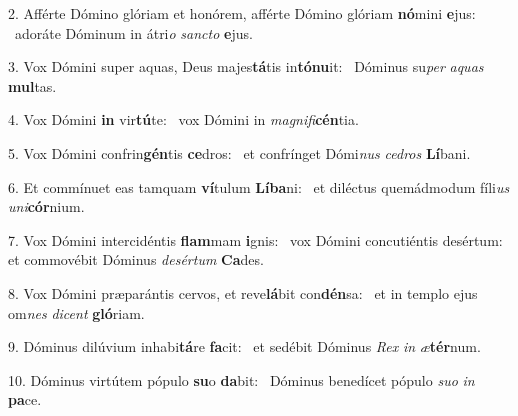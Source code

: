 2. Afférte Dómino glóriam et honórem, afférte Dómino glóriam \textbf{nó}mini \textbf{e}jus: \ast\  adoráte Dóminum in átri\textit{o} \textit{sanc}\textit{to} \textbf{e}jus.\

3. Vox Dómini super aquas, Deus majes\textbf{tá}tis in\textbf{tó}\textbf{nu}it: \ast\  Dóminus su\textit{per} \textit{a}\textit{quas} \textbf{mul}tas.\

4. Vox Dómini \textbf{in} vir\textbf{tú}te: \ast\  vox Dómini in \textit{ma}\textit{gni}\textit{fi}\textbf{cén}tia.\

5. Vox Dómini confrin\textbf{gén}tis \textbf{ce}dros: \ast\  et confrínget Dómi\textit{nus} \textit{ce}\textit{dros} \textbf{Lí}bani.\

6. Et commínuet eas tamquam \textbf{ví}tulum \textbf{Lí}\textbf{ba}ni: \ast\  et diléctus quemádmodum fíli\textit{us} \textit{u}\textit{ni}\textbf{cór}nium.\

7. Vox Dómini intercidéntis \textbf{flam}mam \textbf{i}gnis: \ast\  vox Dómini concutiéntis desértum: et commovébit Dóminus \textit{de}\textit{sér}\textit{tum} \textbf{Ca}des.\

8. Vox Dómini præparántis cervos, et reve\textbf{lá}bit con\textbf{dén}sa: \ast\  et in templo ejus om\textit{nes} \textit{di}\textit{cent} \textbf{gló}riam.\

9. Dóminus dilúvium inhabi\textbf{tá}re \textbf{fa}cit: \ast\  et sedébit Dóminus \textit{Rex} \textit{in} \textit{æ}\textbf{tér}num.\

10. Dóminus virtútem pópulo \textbf{su}o \textbf{da}bit: \ast\  Dóminus benedícet pópulo \textit{su}\textit{o} \textit{in} \textbf{pa}ce.\

